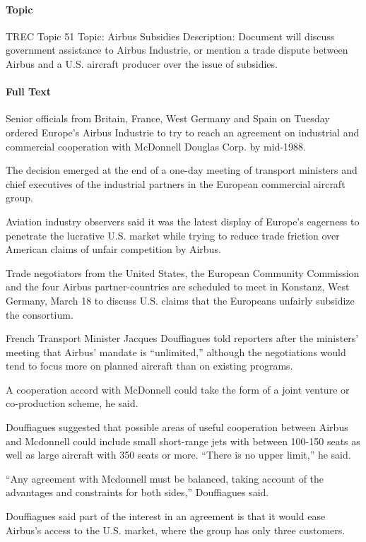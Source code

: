 \documentclass{mprop}
\begin{document}
\paragraph{Topic}
TREC Topic 51
Topic: Airbus Subsidies
Description: Document will discuss government assistance to Airbus Industrie, or mention a
trade dispute between Airbus and a U.S. aircraft producer over the issue of
subsidies. 

\paragraph{Full Text}
Senior officials from Britain, France, West Germany and Spain on Tuesday ordered Europe's Airbus Industrie to try to reach an agreement on industrial and commercial cooperation with McDonnell Douglas Corp. by mid-1988.

The decision emerged at the end of a one-day meeting of transport ministers and chief executives of the industrial partners in the European commercial aircraft group.

Aviation industry observers said it was the latest display of Europe's eagerness to penetrate the lucrative U.S. market while trying to reduce trade friction over American claims of unfair competition by Airbus.

Trade negotiators from the United States, the European Community Commission and the four Airbus partner-countries are scheduled to meet in Konstanz, West Germany, March 18 to discuss U.S. claims that the Europeans unfairly subsidize the consortium.

French Transport Minister Jacques Douffiagues told reporters after the ministers' meeting that Airbus' mandate is ``unlimited,'' although the negotiations would tend to focus more on planned aircraft than on existing programs.

A cooperation accord with McDonnell could take the form of a joint venture or co-production scheme, he said.

Douffiagues suggested that possible areas of useful cooperation between Airbus and Mcdonnell could include small short-range jets with between 100-150 seats as well as large aircraft with 350 seats or more. ``There is no upper limit,'' he said.

``Any agreement with Mcdonnell must be balanced, taking account of the advantages and constraints for both sides,'' Douffiagues said.

Douffiagues said part of the interest in an agreement is that it would ease Airbus's access to the U.S. market, where the group has only three customers.
\end{document}
